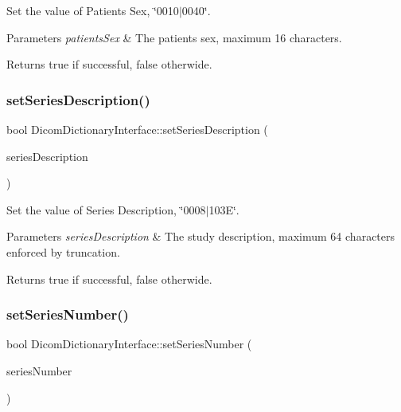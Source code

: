 Set the value of Patient\textquotesingle{}s Sex, \char`\"{}0010$\vert$0040\char`\"{}. 


\begin{DoxyParams}{Parameters}
{\em patients\+Sex} & The patient\textquotesingle{}s sex, maximum 16 characters. \\
\hline
\end{DoxyParams}
\begin{DoxyReturn}{Returns}
true if successful, false otherwide. 
\end{DoxyReturn}
\mbox{\label{class_dicom_dictionary_interface_a680b7c088d0cb60ca55fd19f5967f7e7}} 
\subsubsection{\texorpdfstring{set\+Series\+Description()}{setSeriesDescription()}}
{\footnotesize\ttfamily bool Dicom\+Dictionary\+Interface\+::set\+Series\+Description (\begin{DoxyParamCaption}\item[{Q\+String}]{series\+Description }\end{DoxyParamCaption})}



Set the value of Series Description, \char`\"{}0008$\vert$103\+E\char`\"{}. 


\begin{DoxyParams}{Parameters}
{\em series\+Description} & The study description, maximum 64 characters enforced by truncation. \\
\hline
\end{DoxyParams}
\begin{DoxyReturn}{Returns}
true if successful, false otherwide. 
\end{DoxyReturn}
\mbox{\label{class_dicom_dictionary_interface_ad862cf021e628f7534c8bdddf6233e6c}} 
\subsubsection{\texorpdfstring{set\+Series\+Number()}{setSeriesNumber()}}
{\footnotesize\ttfamily bool Dicom\+Dictionary\+Interface\+::set\+Series\+Number (\begin{DoxyParamCaption}\item[{Q\+String}]{series\+Number }\end{DoxyParamCaption})}




